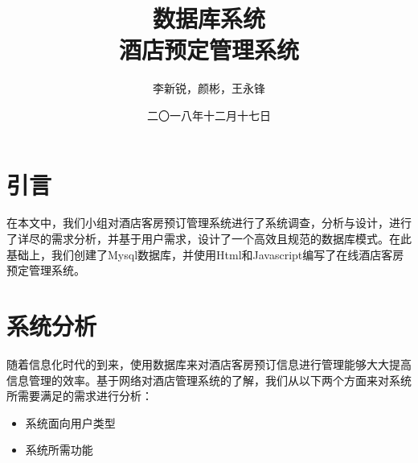\documentclass{myreport}
\begin{document}
\title{数据库系统 \\ 酒店预定管理系统}
\author{李新锐，颜彬，王永锋}                            %
\date{二〇一八年十二月十七日}                %
\maketitle
\frontmatter
\tableofcontents
\mainmatter 


\chapter{引言}

在本文中，我们小组对酒店客房预订管理系统进行了系统调查，分析与设计，进行了详尽的需求分析，并基于用户需求，设计了一个高效且规范的数据库模式。在此基础上，我们创建了Mysql数据库，并使用Html和Javascript编写了在线酒店客房预定管理系统。

\chapter{系统分析}

随着信息化时代的到来，使用数据库来对酒店客房预订信息进行管理能够大大提高信息管理的效率。基于网络对酒店管理系统的了解，我们从以下两个方面来对系统所需要满足的需求进行分析：

\begin{itemize}
    \item 系统面向用户类型
    \item 系统所需功能
\end{itemize}
\end{document}
